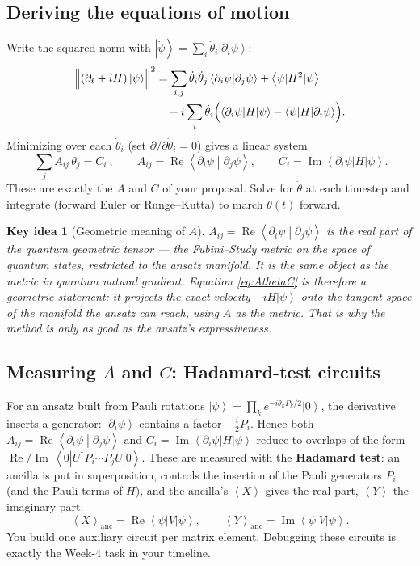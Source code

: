 \documentclass[11pt,a4paper]{article}
\newcommand{\ket}[1]{\left|#1\right\rangle}
\newcommand{\braket}[2]{\left\langle#1\middle|#2\right\rangle}
\newcommand{\ev}[1]{\left\langle#1\right\rangle}
\newcommand{\Real}{\operatorname{Re}}
\newcommand{\Imag}{\operatorname{Im}}
\newtheorem{keyidea}{Key idea}[section]
\begin{document}
\subsection{Deriving the equations of motion}
Write the squared norm with $\ket{\dot\psi}=\sum_i\dot\theta_i\ket{\partial_i\psi}$:
\begin{align}
\Bigl\|(\partial_t+iH)\ket{\psi}\Bigr\|^2
&= \sum_{i,j}\dot\theta_i\dot\theta_j\braket{\partial_i\psi}{\partial_j\psi}
+ \ev{\psi|H^2|\psi} \notag\\
&\quad + i\sum_i\dot\theta_i\Bigl(\ev{\partial_i\psi|H|\psi}-\ev{\psi|H|\partial_i\psi}\Bigr).
\label{eq:normexpand}
\end{align}
Minimizing over each $\dot\theta_i$ (set $\partial/\partial\dot\theta_i=0$) gives a linear system
\begin{equation}
\boxed{\ \sum_j A_{ij}\,\dot\theta_j = C_i\ },\qquad
A_{ij}=\Real\braket{\partial_i\psi}{\partial_j\psi},\qquad
C_i=\Imag\ev{\partial_i\psi|H|\psi}.
\label{eq:AthetaC}
\end{equation}
These are exactly the $A$ and $C$ of your proposal. Solve for $\dot\theta$ at each timestep and
integrate (forward Euler or Runge--Kutta) to march $\theta(t)$ forward.

\begin{keyidea}[Geometric meaning of $A$]
$A_{ij}=\Real\braket{\partial_i\psi}{\partial_j\psi}$ is the real part of the \emph{quantum geometric
tensor} --- the Fubini--Study metric on the space of quantum states, restricted to the ansatz
manifold. It is the \emph{same} object as the metric in quantum natural gradient. Equation
\eqref{eq:AthetaC} is therefore a geometric statement: it \emph{projects} the exact velocity
$-iH\ket{\psi}$ onto the tangent space of the manifold the ansatz can reach, using $A$ as the metric.
That is why the method is only as good as the ansatz's expressiveness.
\end{keyidea}

\subsection{Measuring $A$ and $C$: Hadamard-test circuits}
For an ansatz built from Pauli rotations $\ket{\psi}=\prod_k e^{-i\theta_k P_k/2}\ket{0}$, the
derivative inserts a generator: $\ket{\partial_i\psi}$ contains a factor $-\tfrac{i}{2}P_i$. Hence
both $A_{ij}=\Real\braket{\partial_i\psi}{\partial_j\psi}$ and $C_i=\Imag\ev{\partial_i\psi|H|\psi}$
reduce to overlaps of the form $\Real/\Imag\,\ev{0|U^\dagger P_i \cdots P_j U|0}$. These are measured with
the \textbf{Hadamard test}: an ancilla is put in superposition, controls the insertion of the Pauli
generators $P_i$ (and the Pauli terms of $H$), and the ancilla's $\ev{X}$ gives the real part,
$\ev{Y}$ the imaginary part:
\begin{equation}
\ev{X}_{\text{anc}}=\Real\ev{\psi|V|\psi},\qquad \ev{Y}_{\text{anc}}=\Imag\ev{\psi|V|\psi}.
\label{eq:hadamard}
\end{equation}
You build one auxiliary circuit per matrix element. Debugging these circuits is exactly the Week-4
task in your timeline.
\end{document}
